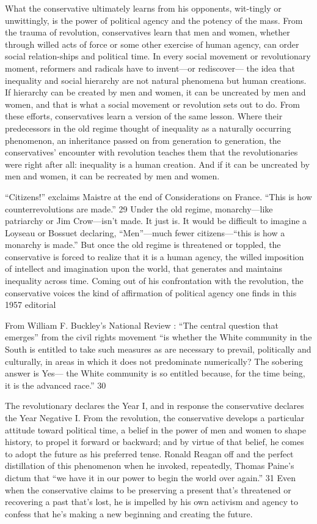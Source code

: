  \par 
What the conservative ultimately learns from his opponents, wit-tingly or unwittingly, is the power of political agency and the potency of the mass. From the trauma of revolution, conservatives learn that men and women, whether through willed acts of force or some other exercise of human agency, can order social relation-ships and political time. In every social movement or revolutionary moment, reformers and radicals have to invent—or rediscover— the idea that inequality and social hierarchy are not natural phenomena but human creations. If hierarchy can be created by men and women, it can be uncreated by men and women, and that is what a social movement or revolution sets out to do. From these efforts, conservatives learn a version of the same lesson. Where their predecessors in the old regime thought of inequality as a naturally occurring phenomenon, an inheritance passed on from generation to generation, the conservatives’ encounter with revolution teaches them that the revolutionaries were right after all: inequality is a human creation. And if it can be uncreated by men and women, it can be recreated by men and women.
 \par 
“Citizens!” exclaims Maistre at the end of Considerations on France. “This is how counterrevolutions are made.” 29 Under the old regime, monarchy—like patriarchy or Jim Crow—isn’t made. It just is. It would be difficult to imagine a Loyseau or Bossuet declaring, “Men”—much fewer citizens—“this is how a monarchy is made.” But once the old regime is threatened or toppled, the conservative is forced to realize that it is a human agency, the willed imposition of intellect and imagination upon the world, that generates and maintains inequality across time. Coming out of his confrontation with the revolution, the conservative voices the kind of affirmation of political agency one finds in this 1957 editorial
 \par 
From William F. Buckley’s National Review : “The central question that emerges” from the civil rights movement “is whether the White community in the South is entitled to take such measures as are necessary to prevail, politically and culturally, in areas in which it does not predominate numerically? The sobering answer is Yes— the White community is so entitled because, for the time being, it is the advanced race.” 30
 \par 
The revolutionary declares the Year I, and in response the conservative declares the Year Negative I. From the revolution, the conservative develops a particular attitude toward political time, a belief in the power of men and women to shape history, to propel it forward or backward; and by virtue of that belief, he comes to adopt the future as his preferred tense. Ronald Reagan off and the perfect distillation of this phenomenon when he invoked, repeatedly, Thomas Paine’s dictum that “we have it in our power to begin the world over again.” 31 Even when the conservative claims to be preserving a present that’s threatened or recovering a past that’s lost, he is impelled by his own activism and agency to confess that he’s making a new beginning and creating the future.
